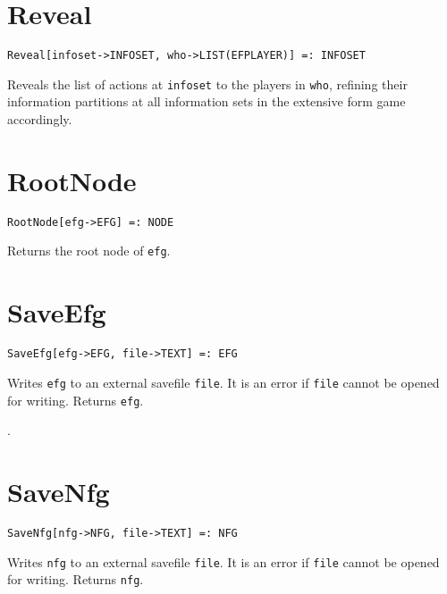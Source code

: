 \section*{Reveal}\label{PrimReveal}
\begin{verbatim}
Reveal[infoset->INFOSET, who->LIST(EFPLAYER)] =: INFOSET 
\end{verbatim}

\noindent
Reveals the list of actions at \verb+infoset+ to the players in \verb+who+,
refining their information partitions at
all information sets in the extensive form game accordingly.  


\section*{RootNode}\label{PrimRootNode}
\begin{verbatim}
RootNode[efg->EFG] =: NODE 
\end{verbatim}

\noindent
Returns the root node of \verb+efg+.


\section*{SaveEfg}\label{PrimSaveEfg}
\begin{verbatim}
SaveEfg[efg->EFG, file->TEXT] =: EFG 
\end{verbatim}

\noindent
Writes \verb+efg+ to an external savefile \verb+file+.  It is an error
if \verb+file+ cannot be opened for writing.  Returns \verb+efg+.

\seealso {}.


\section*{SaveNfg}\label{PrimSaveNfg}
\begin{verbatim}
SaveNfg[nfg->NFG, file->TEXT] =: NFG 
\end{verbatim}

Writes \verb+nfg+ to an external savefile \verb+file+.  It is an
error if \verb+file+ cannot be opened for writing.  Returns \verb+nfg+.

